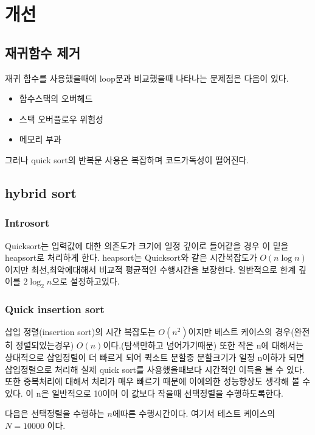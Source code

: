 
\section{개선}

\subsection{재귀함수 제거}

재귀 함수를 사용했을때에 loop문과 비교했을때 나타나는 문제점은 다음이 있다. 

\begin{itemize}
    \item 함수스택의 오버헤드
    \item 스택 오버플로우 위험성
    \item 메모리 부과    
\end{itemize}

그러나 quick sort의 반복문 사용은 복잡하며 코드가독성이 떨어진다.

\subsection{hybrid sort}

\subsubsection{Introsort}
Quicksort는 입력값에 대한 의존도가 크기에 일정 깊이로 들어같을 경우 이 밑을 heapsort로 처리하게 한다. heapsort는 Quicksort와 같은 시간복잡도가 $O(n \log n)$이지만 최선,최악에대해서 비교적 평균적인 수행시간을 보장한다. 일반적으로 한계 깊이를 $2\log_2 n$으로 설정하고있다.

\subsubsection{Quick insertion sort}
삽입 정렬(insertion sort)의 시간 복잡도는 $O(n^2)$이지만 베스트 케이스의 경우(완전히 정렬되있는경우) $O(n)$이다.(탐색만하고 넘어가기때문) 또한 작은 n에 대해서는 상대적으로 삽입정렬이 더 빠르게 되어 퀵소트 분할중 분할크기가 일정 n이하가 되면 삽입정렬으로 처리해 실제 quick sort를 사용했을때보다 시간적인 이득을 볼 수 있다. 또한 중복처리에 대해서 처리가 매우 빠르기 때문에 이에의한 성능향상도 생각해 볼 수 있다.
이 n은 일반적으로 10이며 이 값보다 작을때 선택정렬을 수행하도록한다. 

다음은 선택정렬을 수행하는 $n$에따른 수행시간이다. 여기서 테스트 케이스의 $N =10000$ 이다.

